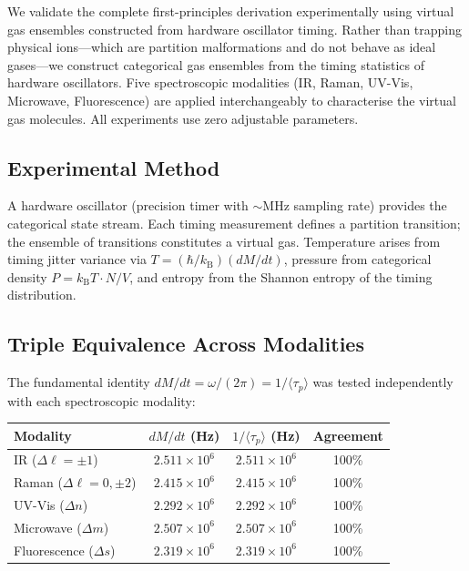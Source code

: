 \documentclass[twocolumn,10pt,a4paper]{article}
\theoremstyle{plain}
\theoremstyle{definition}
\theoremstyle{remark}
\newcommand{\kB}{k_{\mathrm{B}}}
\begin{document}
We validate the complete first-principles derivation experimentally using virtual gas ensembles constructed from hardware oscillator timing. Rather than trapping physical ions---which are partition malformations and do not behave as ideal gases---we construct categorical gas ensembles from the timing statistics of hardware oscillators. Five spectroscopic modalities (IR, Raman, UV-Vis, Microwave, Fluorescence) are applied interchangeably to characterise the virtual gas molecules. All experiments use zero adjustable parameters.

\subsection{Experimental Method}

A hardware oscillator (precision timer with $\sim$MHz sampling rate) provides the categorical state stream. Each timing measurement defines a partition transition; the ensemble of transitions constitutes a virtual gas. Temperature arises from timing jitter variance via $T = (\hbar/\kB)(dM/dt)$, pressure from categorical density $P = \kB T \cdot N/V$, and entropy from the Shannon entropy of the timing distribution.

\subsection{Triple Equivalence Across Modalities}

The fundamental identity $dM/dt = \omega/(2\pi) = 1/\langle\tau_p\rangle$ was tested independently with each spectroscopic modality:

\begin{center}
\begin{tabular}{lccc}
\toprule
Modality & $dM/dt$ (Hz) & $1/\langle\tau_p\rangle$ (Hz) & Agreement \\
\midrule
IR ($\Delta\ell = \pm 1$) & $2.511 \times 10^6$ & $2.511 \times 10^6$ & 100\% \\
Raman ($\Delta\ell = 0, \pm 2$) & $2.415 \times 10^6$ & $2.415 \times 10^6$ & 100\% \\
UV-Vis ($\Delta n$) & $2.292 \times 10^6$ & $2.292 \times 10^6$ & 100\% \\
Microwave ($\Delta m$) & $2.507 \times 10^6$ & $2.507 \times 10^6$ & 100\% \\
Fluorescence ($\Delta s$) & $2.319 \times 10^6$ & $2.319 \times 10^6$ & 100\% \\
\bottomrule
\end{tabular}
\end{center}
\end{document}
